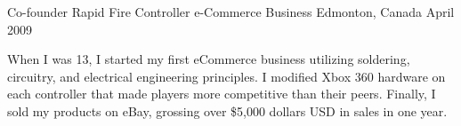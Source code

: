

\begin{cventries}

  \cventry
    {Co-founder} %
    {Rapid Fire Controller e-Commerce Business} %
    {Edmonton, Canada} %
    {April 2009} %
    {
      \begin{cvitems} %
        \item {When I was 13, I started my first eCommerce business utilizing soldering, circuitry, and electrical engineering principles. I modified Xbox 360 hardware on each controller that made players more competitive than their peers. Finally, I sold my products on eBay, grossing over \$5,000 dollars USD in sales in one year.}
      \end{cvitems}
    }
\end{cventries}

